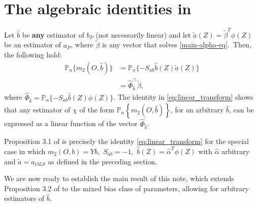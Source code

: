 \documentclass{article}
\begin{document}
\section{The algebraic identities in \cite{bruns2025augmented}}\label{sec:bruns}


Let $\widehat{b}$ be \textbf{any} estimator of $b_{P}$ (not necessarily
linear) and let $\widetilde{a}\left( Z\right) =\widetilde{\beta }^{T}\phi
\left( Z\right) $ be an estimator of $a_{P}$, where $\widetilde{\beta }$ is
any vector that solves \eqref{main-alpha-eq}.\ Then, the following hold: 
\begin{align}
\mathbb{P}_{n}\{m_{2}(O,\widehat{b})\}& =\mathbb{P}_{n}\{-S_{ab}\widehat{b}%
(Z)\widetilde{a}(Z)\}  \label{eq:basic} \\
& =\widehat{\Phi }_{\widehat{b}}^{\top }\widetilde{\beta },
\label{eq:linear_transform}
\end{align}%
where $\widehat{\Phi }_{\widehat{b}}=\mathbb{P}_{n}\{-S_{ab}\widehat{b}%
(Z)\phi (Z)\}$. The identity in \eqref{eq:linear_transform} shows that any
estimator of $\chi $ of the form $\mathbb{P}_{n}\left\{ m_{2}(O,\widehat{b}%
)\right\} $, for an arbitrary $\widehat{b}$, can be expressed as a linear
function of the vector $\widehat{\Phi }_{\widehat{b}}$.

Proposition 3.1 of \cite{bruns2025augmented} is precisely the identity %
\eqref{eq:linear_transform} for the special case in which $m_{2}(O,b)=Yb,$ $%
S_{ab}=-1,$ $\widehat{b}(Z)=\widehat{\alpha }^{T}\phi \left( Z\right) $ with 
$\widehat{\alpha }$ arbitrary and $\widetilde{a}=\widehat{a}_{OLS}$ as
defined in the preceding section. 

We are now ready to establish the main result of this note, which extends
Proposition 3.2 of \cite{bruns2025augmented} to the mixed bias class of
parameters, allowing for arbitrary estimators of $\widehat{b}$.
\end{document}
